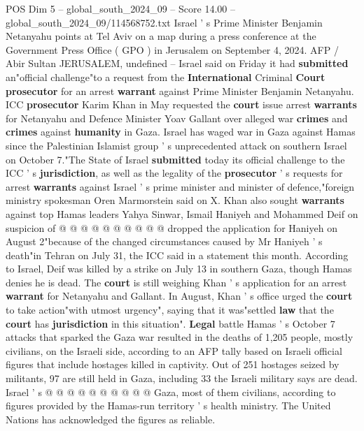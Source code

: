 \begin{textsample}{POS Dim 5 – global\_south\_2024\_09 – Score 14.00 – global\_south\_2024\_09/114568752.txt}  \label{ex:f5_pos_236}
Israel ' s Prime Minister Benjamin Netanyahu points at Tel Aviv on a map during a press conference at the Government Press Office ( GPO ) in Jerusalem on September 4, 2024.
AFP / Abir Sultan JERUSALEM, undefined -- Israel said on Friday it had \textbf{submitted} an"official challenge"to a request from the \textbf{International} Criminal \textbf{Court} \textbf{prosecutor} for an arrest \textbf{warrant} against Prime Minister Benjamin Netanyahu.
ICC \textbf{prosecutor} Karim Khan in May requested the \textbf{court} issue arrest \textbf{warrants} for Netanyahu and Defence Minister Yoav Gallant over alleged war \textbf{crimes} and \textbf{crimes} against \textbf{humanity} in Gaza.
Israel has waged war in Gaza against Hamas since the Palestinian Islamist group ' s unprecedented attack on southern Israel on October 7."The State of Israel \textbf{submitted} today its official challenge to the ICC ' s \textbf{jurisdiction}, as well as the legality of the \textbf{prosecutor} ' s requests for arrest \textbf{warrants} against Israel ' s prime minister and minister of defence,"foreign ministry spokesman Oren Marmorstein said on X.
Khan also sought \textbf{warrants} against top Hamas leaders Yahya Sinwar, Ismail Haniyeh and Mohammed Deif on suspicion of @ @ @ @ @ @ @ @ @ @ dropped the application for Haniyeh on August 2"because of the changed circumstances caused by Mr Haniyeh ' s death"in Tehran on July 31, the ICC said in a statement this month.
According to Israel, Deif was killed by a strike on July 13 in southern Gaza, though Hamas denies he is dead.
The \textbf{court} is still weighing Khan ' s application for an arrest \textbf{warrant} for Netanyahu and Gallant.
In August, Khan ' s office urged the \textbf{court} to take action"with utmost urgency", saying that it was"settled \textbf{law} that the \textbf{court} has \textbf{jurisdiction} in this situation". \textbf{Legal} battle Hamas ' s October 7 attacks that sparked the Gaza war resulted in the deaths of 1,205 people, mostly civilians, on the Israeli side, according to an AFP tally based on Israeli official figures that include hostages killed in captivity.
Out of 251 hostages seized by militants, 97 are still held in Gaza, including 33 the Israeli military says are dead.
Israel ' s @ @ @ @ @ @ @ @ @ @ Gaza, most of them civilians, according to figures provided by the Hamas-run territory ' s health ministry.
The United Nations has acknowledged the figures as reliable.

\end{textsample}
